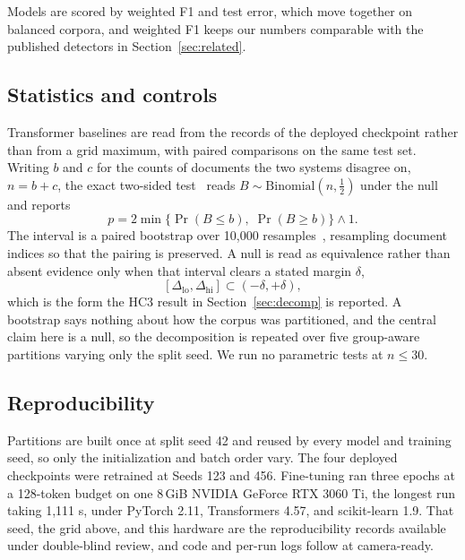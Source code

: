 \documentclass[conference,a4paper]{IEEEtran}
\newcommand{\secref}[1]{\hyperref[#1]{\ref*{#1}}}
\begin{document}
Models are scored by weighted F1 and test error, which move together on balanced corpora, and weighted F1 keeps our numbers comparable with the published detectors in Section~\secref{sec:related}.

\subsection{Statistics and controls}
\label{sec:stats}

Transformer baselines are read from the records of the deployed checkpoint rather than from a grid maximum, with paired comparisons on the same test set. Writing $b$ and $c$ for the counts of documents the two systems disagree on, $n=b+c$, the exact two-sided test~\cite{McNemar1947note} reads $B \sim \mathrm{Binomial}(n, \tfrac{1}{2})$ under the null and reports
\begin{equation}
\label{eq:mcnemar}
p = 2\min\big\{\Pr(B \le b),\; \Pr(B \ge b)\big\} \wedge 1 .
\end{equation}
The interval is a paired bootstrap over 10,000 resamples~\cite{Efron1979bootstrap}, resampling document indices so that the pairing is preserved. A null is read as equivalence rather than absent evidence only when that interval clears a stated margin $\delta$,
\begin{equation}
\label{eq:tost}
[\Delta_{\text{lo}}, \Delta_{\text{hi}}] \subset (-\delta, +\delta),
\end{equation}
which is the form the HC3 result in Section~\secref{sec:decomp} is reported. A bootstrap says nothing about how the corpus was partitioned, and the central claim here is a null, so the decomposition is repeated over five group-aware partitions varying only the split seed. We run no parametric tests at $n \le 30$.

\subsection{Reproducibility}
\label{sec:repro}

Partitions are built once at split seed 42 and reused by every model and training seed, so only the initialization and batch order vary. The four deployed checkpoints were retrained at Seeds 123 and 456. Fine-tuning ran three epochs at a 128-token budget on one 8\,GiB NVIDIA GeForce RTX 3060 Ti, the longest run taking 1,111 s, under PyTorch 2.11, Transformers 4.57, and scikit-learn 1.9. That seed, the grid above, and this hardware are the reproducibility records available under double-blind review, and code and per-run logs follow at camera-ready.
\end{document}
